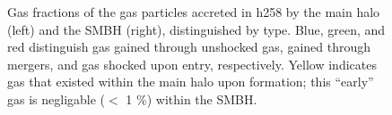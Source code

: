 \documentclass[manuscript]{aastex}
\begin{document}
\begin{figure}
\centerline{}
\caption[]{Gas fractions of the gas particles accreted in h258 by the main halo (left) and the SMBH (right), distinguished by type. Blue, green, and red distinguish gas gained through unshocked gas, gained through mergers, and gas shocked upon entry, respectively. Yellow indicates gas that existed within the main halo upon formation; this ``early'' gas is negligable ($<$ 1 \%) within the SMBH.}
\label{h277stackfrac} 
\end{figure}
\end{document}
